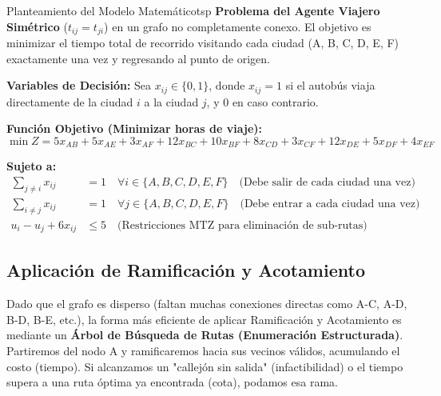 \documentclass[10pt,a4paper]{article}
\begin{document}
\begin{ejercicio}{Planteamiento del Modelo Matemático}{tsp}
\textbf{Problema del Agente Viajero Simétrico} ($t_{ij} = t_{ji}$) en un grafo no completamente conexo. El objetivo es minimizar el tiempo total de recorrido visitando cada ciudad (A, B, C, D, E, F) exactamente una vez y regresando al punto de origen.

\textbf{Variables de Decisión:}
Sea $x_{ij} \in \{0, 1\}$, donde $x_{ij} = 1$ si el autobús viaja directamente de la ciudad $i$ a la ciudad $j$, y $0$ en caso contrario.

\textbf{Función Objetivo (Minimizar horas de viaje):}
\[ \min Z = 5x_{AB} + 5x_{AE} + 3x_{AF} + 12x_{BC} + 10x_{BF} + 8x_{CD} + 3x_{CF} + 12x_{DE} + 5x_{DF} + 4x_{EF} \]

\textbf{Sujeto a:}
\begin{align*}
    \sum_{j \neq i} x_{ij} &= 1 \quad \forall i \in \{A,B,C,D,E,F\} \quad \text{(Debe salir de cada ciudad una vez)} \\
    \sum_{i \neq j} x_{ij} &= 1 \quad \forall j \in \{A,B,C,D,E,F\} \quad \text{(Debe entrar a cada ciudad una vez)} \\
    u_i - u_j + 6x_{ij} &\leq 5 \quad \text{(Restricciones MTZ para eliminación de sub-rutas)}
\end{align*}
\end{ejercicio}

\subsection{Aplicación de Ramificación y Acotamiento}

Dado que el grafo es disperso (faltan muchas conexiones directas como A-C, A-D, B-D, B-E, etc.), la forma más eficiente de aplicar Ramificación y Acotamiento es mediante un \textbf{Árbol de Búsqueda de Rutas (Enumeración Estructurada)}. Partiremos del nodo A y ramificaremos hacia sus vecinos válidos, acumulando el costo (tiempo). Si alcanzamos un "callejón sin salida" (infactibilidad) o el tiempo supera a una ruta óptima ya encontrada (cota), podamos esa rama.
\end{document}
